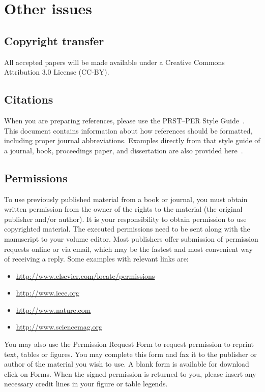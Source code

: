 \documentclass[english,aps,pra,reprint,noshowpacs,superscriptaddress]{revtex4-1}
\begin{document}

\section{Other issues}

\subsection{Copyright transfer}
All accepted papers will be made available under a Creative Commons Attribution 3.0 License (CC-BY).

\subsection{Citations}
When you are preparing references, please use the PRST--PER Style Guide~\cite{style-guide}.  This document contains information about how references should be formatted, including proper journal abbreviations.  Examples directly from that style guide of a journal, book, proceedings paper, and dissertation are also provided here~\cite{smith-brown,smith,smith-proc,smith-diss}.

\subsection{Permissions}
To use previously published material from a book or journal, you must obtain written permission from the owner of the rights to the material (the original publisher and/or author). It is your responsibility to obtain permission to use copyrighted material. The executed permissions need to be sent along with the manuscript to your volume editor. Most publishers offer submission of permission requests online or via email, which may be the fastest and most convenient way of receiving a reply. Some examples with relevant links are:

\begin{itemize}
\item \url{http://www.elsevier.com/locate/permissions}
\item \url{http://www.ieee.org}
\item \url{http://www.nature.com}
\item \url{http://www.sciencemag.org}
\end{itemize}

You may also use the Permission Request Form to request permission to reprint text, tables or figures. You may complete this form and fax it to the publisher or author of the material you wish to use. A blank form is available for download click on Forms. When the signed permission is returned to you, please insert any necessary credit lines in your figure or table legends.
\end{document}
